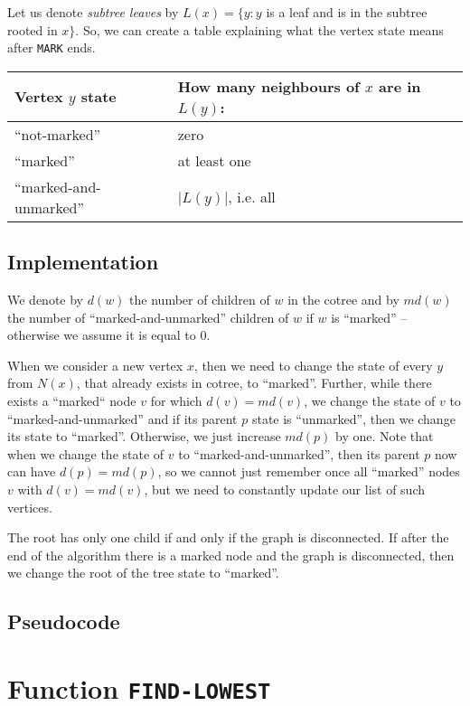 Let us denote \emph{subtree leaves} by $L(x)=\{y : y$ is a leaf and is in the subtree rooted in $x\}$. 
So, we can create a table explaining what the vertex state means after \texttt{MARK} ends. 

\begin{center}
    \begin{tabular}{ | p{45mm} | p{60mm} | }
    \hline
    Vertex $y$ state & How many neighbours of $x$ are in $L(y)$:  \\ [0.5ex] 
    \hline\hline
    ``not-marked'' & zero \\
    \hline
    ``marked'' & at least one \\
    \hline
    ``marked-and-unmarked'' & $|L(y)|$, i.e. all \\
    \hline
    \end{tabular}
\end{center}
\subsection{Implementation}

We denote by $d(w)$ the number of children of $w$ in the cotree and by $md(w)$ the number of ``marked-and-unmarked'' children of $w$ if $w$ is ``marked'' -- otherwise we assume it is equal to $0$. 

When we consider a new vertex $x$, then we need to change the state of every $y$ from $N(x)$, that already exists in cotree, to ``marked''. Further, while there exists a ``marked`` node $v$ for which $d(v) = md(v)$, we change the state of $v$ to ``marked-and-unmarked'' and if its parent $p$ state is ``unmarked'', then we change its state to ``marked''. Otherwise, we just increase $md(p)$ by one. Note that when we change the state of $v$ to ``marked-and-unmarked'', then its parent $p$ now can have $d(p) = md(p)$, so we cannot just remember once all ``marked'' nodes $v$ with $d(v) = md(v)$, but we need to constantly update our list of such vertices.

The root has only one child if and only if the graph is disconnected. If after the end of the algorithm there is a marked node and the graph is disconnected, then we change the root of the tree state to ``marked''.

\subsection{Pseudocode}



\section{Function \texttt{FIND-LOWEST}}

